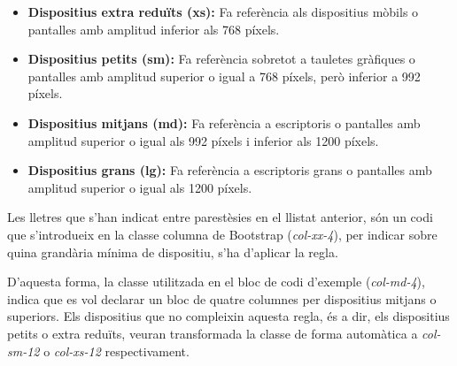     \begin{itemize}
        \item \textbf{Dispositius extra reduïts (xs):} Fa referència als dispositius mòbils o pantalles amb amplitud inferior als 768 píxels.
        \item \textbf{Dispositius petits (sm):} Fa referència sobretot a tauletes gràfiques o pantalles amb amplitud superior o igual a 768 píxels, però inferior a 992 píxels.
        \item \textbf{Dispositius mitjans (md):} Fa referència a escriptoris o pantalles amb amplitud superior o igual als 992 píxels i inferior als 1200 píxels.
        \item \textbf{Dispositius grans (lg):} Fa referència a escriptoris grans o pantalles amb amplitud superior o igual als 1200 píxels.
    \end{itemize}

    Les lletres que s'han indicat entre parestèsies en el llistat anterior,  són un codi que s'introdueix en la classe columna de Bootstrap (\emph{col-xx-4}), per indicar sobre quina grandària mínima de dispositiu, s'ha d'aplicar la regla.

    D'aquesta forma, la classe utilitzada en el bloc de codi d'exemple (\emph{col-md-4}), indica que es vol declarar un bloc de quatre columnes per dispositius mitjans o superiors. Els dispositius que no compleixin aquesta regla, és a dir, els dispositius petits o extra reduïts, veuran transformada la classe de forma automàtica a \emph{col-sm-12} o \emph{col-xs-12} respectivament. 
